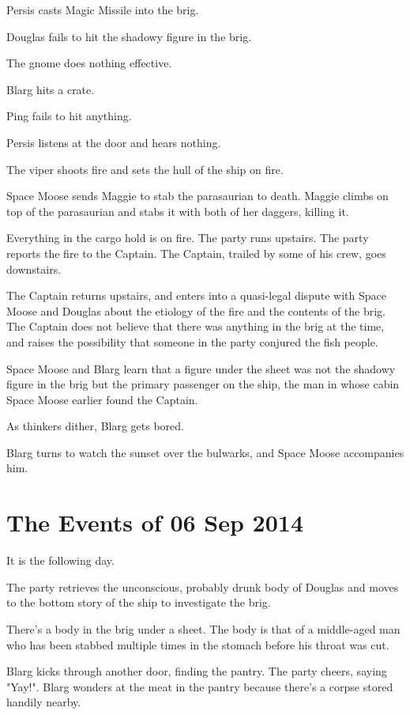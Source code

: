 \documentclass{article}
\begin{document}
Persis casts Magic Missile into the brig.

Douglas fails to hit the shadowy figure in the brig.

The gnome does nothing effective.

Blarg hits a crate.

Ping fails to hit anything.

Persis listens at the door and hears nothing.

The viper shoots fire and sets the hull of the ship on fire.

Space Moose sends Maggie to stab the parasaurian to death. Maggie climbs on top of the parasaurian and stabs it with both of her daggers, killing it.

Everything in the cargo hold is on fire. The party runs upstairs. The party reports the fire to the Captain. The Captain, trailed by some of his crew, goes downstairs.

The Captain returns upstairs, and enters into a quasi-legal dispute with Space Moose and Douglas about the etiology of the fire and the contents of the brig. The Captain does not believe that there was anything in the brig at the time, and raises the possibility that someone in the party conjured the fish people. 

Space Moose and Blarg learn that a figure under the sheet was not the shadowy figure in the brig but the primary passenger on the ship, the man in whose cabin Space Moose earlier found the Captain.

As thinkers dither, Blarg gets bored.

Blarg turns to watch the sunset over the bulwarks, and Space Moose accompanies him.

\section{The Events of 06 Sep 2014}

It is the following day.

The party retrieves the unconscious, probably drunk body of Douglas and moves to the bottom story of the ship to investigate the brig.

There's a body in the brig under a sheet. The body is that of a middle-aged man who has been stabbed multiple times in the stomach before his throat was cut.

Blarg kicks through another door, finding the pantry. The party cheers, saying "Yay!". Blarg wonders at the meat in the pantry because there's a corpse stored handily nearby.
\end{document}
